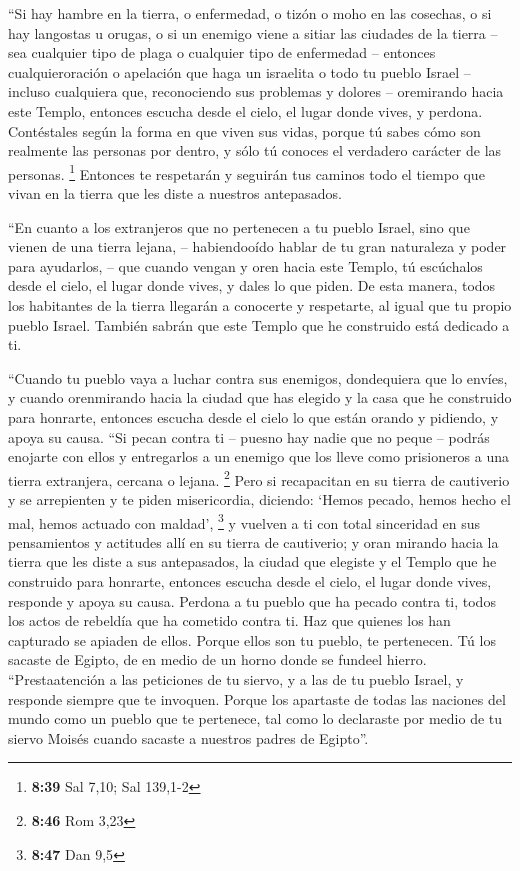  ``Si hay hambre en la tierra, o enfermedad, o tizón o
moho en las cosechas, o si hay langostas u orugas, o si un enemigo viene
a sitiar las ciudades de la tierra -- sea cualquier tipo de plaga o
cualquier tipo de enfermedad --  entonces
cualquieroración o apelación que haga un israelita o todo tu pueblo
Israel -- incluso cualquiera que, reconociendo sus problemas y dolores
-- oremirando hacia este Templo,  entonces escucha desde
el cielo, el lugar donde vives, y perdona. Contéstales según la forma en
que viven sus vidas, porque tú sabes cómo son realmente las personas por
dentro, y sólo tú conoces el verdadero carácter de las personas.
\footnote{\textbf{8:39} Sal 7,10; Sal 139,1-2}  Entonces
te respetarán y seguirán tus caminos todo el tiempo que vivan en la
tierra que les diste a nuestros antepasados.

 ``En cuanto a los extranjeros que no pertenecen a tu
pueblo Israel, sino que vienen de una tierra lejana,  --
habiendooído hablar de tu gran naturaleza y poder para ayudarlos, -- que
cuando vengan y oren hacia este Templo,  tú escúchalos
desde el cielo, el lugar donde vives, y dales lo que piden. De esta
manera, todos los habitantes de la tierra llegarán a conocerte y
respetarte, al igual que tu propio pueblo Israel. También sabrán que
este Templo que he construido está dedicado a ti.

 ``Cuando tu pueblo vaya a luchar contra sus enemigos,
dondequiera que lo envíes, y cuando orenmirando hacia la ciudad que has
elegido y la casa que he construido para honrarte, 
entonces escucha desde el cielo lo que están orando y pidiendo, y apoya
su causa.  ``Si pecan contra ti -- puesno hay nadie que
no peque -- podrás enojarte con ellos y entregarlos a un enemigo que los
lleve como prisioneros a una tierra extranjera, cercana o lejana.
\footnote{\textbf{8:46} Rom 3,23}  Pero si recapacitan en
su tierra de cautiverio y se arrepienten y te piden misericordia,
diciendo: `Hemos pecado, hemos hecho el mal, hemos actuado con maldad',
\footnote{\textbf{8:47} Dan 9,5}  y vuelven a ti con
total sinceridad en sus pensamientos y actitudes allí en su tierra de
cautiverio; y oran mirando hacia la tierra que les diste a sus
antepasados, la ciudad que elegiste y el Templo que he construido para
honrarte,  entonces escucha desde el cielo, el lugar
donde vives, responde y apoya su causa.  Perdona a tu
pueblo que ha pecado contra ti, todos los actos de rebeldía que ha
cometido contra ti. Haz que quienes los han capturado se apiaden de
ellos.  Porque ellos son tu pueblo, te pertenecen. Tú los
sacaste de Egipto, de en medio de un horno donde se fundeel hierro.
 ``Prestaatención a las peticiones de tu siervo, y a las
de tu pueblo Israel, y responde siempre que te invoquen. 
Porque los apartaste de todas las naciones del mundo como un pueblo que
te pertenece, tal como lo declaraste por medio de tu siervo Moisés
cuando sacaste a nuestros padres de Egipto''.

